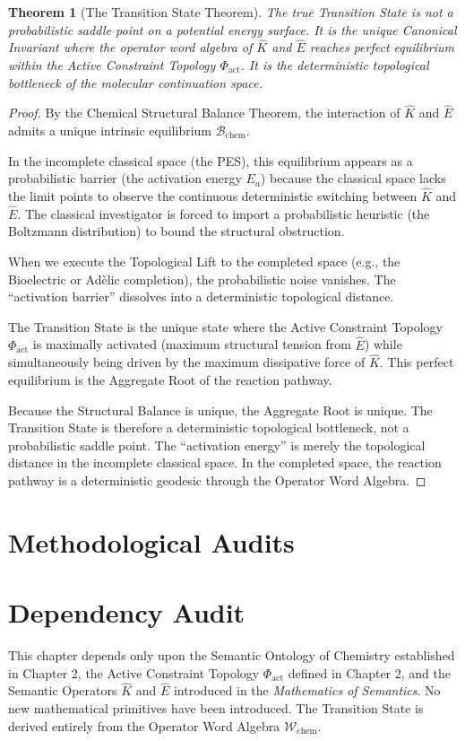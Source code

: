 \documentclass[11pt,openany]{extbook}
\newenvironment{dependencyaudit}{\section*{Dependency Audit}}{}
\theoremstyle{plain}
\newtheorem{theorem}{Theorem}[chapter]
\theoremstyle{definition}
\begin{document}
\begin{theorem}[The Transition State Theorem]
The true Transition State is not a probabilistic saddle point on a potential energy surface. It is the unique Canonical Invariant where the operator word algebra of $\hat{K}$ and $\hat{E}$ reaches perfect equilibrium within the Active Constraint Topology $\Phi_{\text{act}}$. It is the deterministic topological bottleneck of the molecular continuation space.
\end{theorem}
\begin{proof}
By the Chemical Structural Balance Theorem, the interaction of $\hat{K}$ and $\hat{E}$ admits a unique intrinsic equilibrium $\mathcal{B}_{\text{chem}}$.

In the incomplete classical space (the PES), this equilibrium appears as a probabilistic barrier (the activation energy $E_a$) because the classical space lacks the limit points to observe the continuous deterministic switching between $\hat{K}$ and $\hat{E}$. The classical investigator is forced to import a probabilistic heuristic (the Boltzmann distribution) to bound the structural obstruction.

When we execute the Topological Lift to the completed space (e.g., the Bioelectric or Adèlic completion), the probabilistic noise vanishes. The ``activation barrier'' dissolves into a deterministic topological distance.

The Transition State is the unique state where the Active Constraint Topology $\Phi_{\text{act}}$ is maximally activated (maximum structural tension from $\hat{E}$) while simultaneously being driven by the maximum dissipative force of $\hat{K}$. This perfect equilibrium is the Aggregate Root of the reaction pathway.

Because the Structural Balance is unique, the Aggregate Root is unique. The Transition State is therefore a deterministic topological bottleneck, not a probabilistic saddle point. The ``activation energy'' is merely the topological distance in the incomplete classical space. In the completed space, the reaction pathway is a deterministic geodesic through the Operator Word Algebra.
\end{proof}

\section{Methodological Audits}

\begin{dependencyaudit}
This chapter depends only upon the Semantic Ontology of Chemistry established in Chapter 2, the Active Constraint Topology $\Phi_{\text{act}}$ defined in Chapter 2, and the Semantic Operators $\hat{K}$ and $\hat{E}$ introduced in the \emph{Mathematics of Semantics}. No new mathematical primitives have been introduced. The Transition State is derived entirely from the Operator Word Algebra $\mathcal{W}_{\text{chem}}$.
\end{dependencyaudit}
\end{document}
